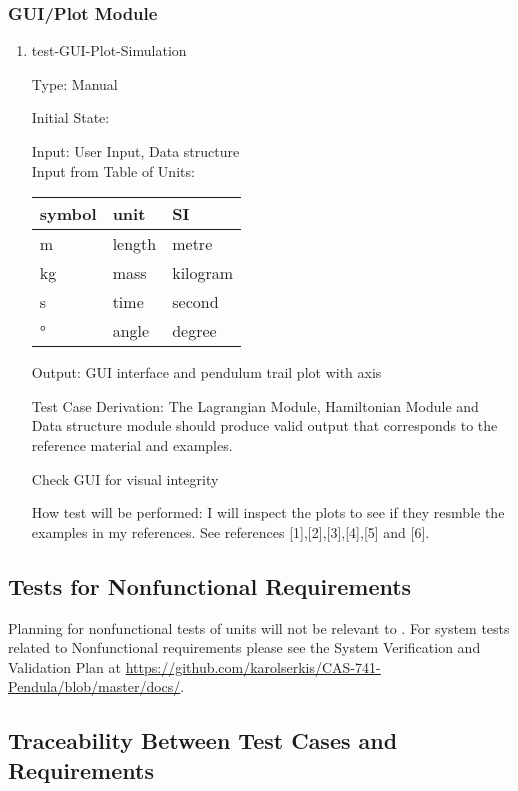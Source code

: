 \documentclass[12pt, titlepage]{article}
\begin{document}
\subsubsection{GUI/Plot Module} 

\begin{enumerate}				
	\item{test-GUI-Plot-Simulation\\}
	
	Type: Manual
	
	Initial State: 
	
	Input: User Input, Data structure\\
	Input from Table of Units:\\
  \noindent \begin{tabular}{l l l} 
    \toprule		
    \textbf{symbol} & \textbf{unit} & \textbf{SI}\\
    \midrule 
    \si{\metre} & length & metre\\
    \si{\kilogram} & mass & kilogram\\
    \si{\second} & time & second\\
    \si{\degree} & angle & degree\\
    \bottomrule
  \end{tabular}
	
	Output: GUI interface and pendulum trail plot with axis
	
	Test Case Derivation: The Lagrangian Module, Hamiltonian Module and Data structure module should produce valid
	output that corresponds to the reference material and examples.
	
	Check GUI for visual integrity
	
	How test will be performed: I will inspect the plots to see if 
	they resmble the examples in my references. See references [1],[2],[3],[4],[5] and [6].
\end{enumerate} 

\subsection{Tests for Nonfunctional Requirements}

Planning for nonfunctional tests of units will not be relevant to \progname. 
For system tests related to Nonfunctional requirements please see the System 
Verification and Validation Plan at 
\url{https://github.com/karolserkis/CAS-741-Pendula/blob/master/docs/}. 

\subsection{Traceability Between Test Cases and Requirements}
\end{document}
